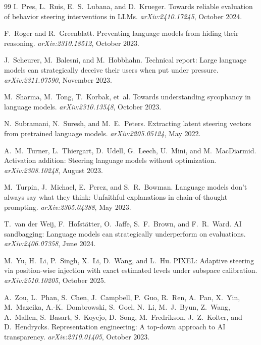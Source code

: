 \documentclass[11pt]{article}
\theoremstyle{definition}
\newcommand{\1}{\mathbf{1}}
\begin{document}
\begin{thebibliography}{99}
I.~Pres, L.~Ruis, E.~S.~Lubana, and D.~Krueger.
\newblock Towards reliable evaluation of behavior steering interventions in LLMs.
\newblock \emph{arXiv:2410.17245}, October 2024.

F.~Roger and R.~Greenblatt.
\newblock Preventing language models from hiding their reasoning.
\newblock \emph{arXiv:2310.18512}, October 2023.

J.~Scheurer, M.~Balesni, and M.~Hobbhahn.
\newblock Technical report: Large language models can strategically deceive their users when put under pressure.
\newblock \emph{arXiv:2311.07590}, November 2023.

M.~Sharma, M.~Tong, T.~Korbak, et~al.
\newblock Towards understanding sycophancy in language models.
\newblock \emph{arXiv:2310.13548}, October 2023.

N.~Subramani, N.~Suresh, and M.~E.~Peters.
\newblock Extracting latent steering vectors from pretrained language models.
\newblock \emph{arXiv:2205.05124}, May 2022.

A.~M.~Turner, L.~Thiergart, D.~Udell, G.~Leech, U.~Mini, and M.~MacDiarmid.
\newblock Activation addition: Steering language models without optimization.
\newblock \emph{arXiv:2308.10248}, August 2023.

M.~Turpin, J.~Michael, E.~Perez, and S.~R.~Bowman.
\newblock Language models don't always say what they think: Unfaithful explanations in chain-of-thought prompting.
\newblock \emph{arXiv:2305.04388}, May 2023.

T.~van der Weij, F.~Hofst\"atter, O.~Jaffe, S.~F.~Brown, and F.~R.~Ward.
\newblock AI sandbagging: Language models can strategically underperform on evaluations.
\newblock \emph{arXiv:2406.07358}, June 2024.

M.~Yu, H.~Li, P.~Singh, X.~Li, D.~Wang, and L.~Hu.
\newblock PIXEL: Adaptive steering via position-wise injection with exact estimated levels under subspace calibration.
\newblock \emph{arXiv:2510.10205}, October 2025.

A.~Zou, L.~Phan, S.~Chen, J.~Campbell, P.~Guo, R.~Ren, A.~Pan, X.~Yin, M.~Mazeika, A.-K.~Dombrowski, S.~Goel, N.~Li, M.~J.~Byun, Z.~Wang, A.~Mallen, S.~Basart, S.~Koyejo, D.~Song, M.~Fredrikson, J.~Z.~Kolter, and D.~Hendrycks.
\newblock Representation engineering: A top-down approach to AI transparency.
\newblock \emph{arXiv:2310.01405}, October 2023.

\end{thebibliography}
\end{document}
